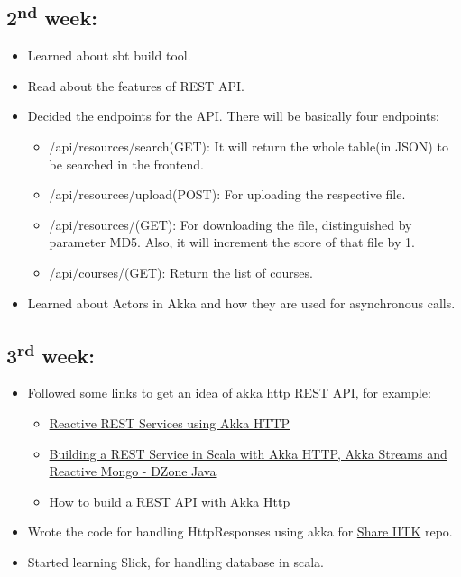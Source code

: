 \documentclass{article}
\begin{document}
\subsection*{2\textsuperscript{nd} week:}
\begin{itemize}
    \item Learned about sbt build tool.
    \item Read about the features of REST API.
    \item Decided the endpoints for the API. There will be basically four endpoints:
        \begin{itemize}
            \item /api/resources/search(GET): It will return the whole table(in JSON) to be searched in the frontend.
            \item /api/resources/upload(POST): For uploading the respective file.
            \item /api/resources/(GET): For downloading the file, distinguished by parameter MD5. Also, it will increment the score of that file by 1.
            \item /api/courses/(GET): Return the list of courses.
        \end{itemize}
    \item Learned about Actors in Akka and how they are used for asynchronous calls.
    \end{itemize}
\subsection*{3\textsuperscript{rd} week:}
\begin{itemize}
    \item Followed some links to get an idea of akka http REST API, for example:
        \begin{itemize}
            \item \href{https://spindance.com/reactive-rest-services-akka-http/}{Reactive REST Services using Akka HTTP}
            \item \href{https://dzone.com/articles/building-rest-service-scala}{Building a REST Service in Scala with Akka HTTP, Akka Streams and Reactive Mongo - DZone Java}
            \item \href{https://danielasfregola.com/2016/02/07/how-to-build-a-rest-api-with-akka-http/}{How to build a REST API with Akka Http}
    \end{itemize}
    \item Wrote the code for handling HttpResponses using akka for \href{https://github.com/abhayptp/share-iitk}{Share IITK} repo.
    \item Started learning Slick, for handling database in scala.
\end{itemize}
\end{document}
